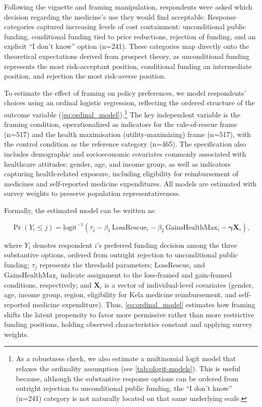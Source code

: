 \documentclass[11pt]{article}\usepackage[]{graphicx}\usepackage[]{xcolor}
\begin{document}
\begin{table}[htbp]
\end{table}

Following the vignette and framing manipulation, respondents were asked which decision regarding the medicine's use they would find acceptable. Response categories captured increasing levels of cost containment: unconditional public funding, conditional funding tied to price reductions, rejection of funding, and an explicit ``I don't know'' option (n=241). These categories map directly onto the theoretical expectations derived from prospect theory, as unconditional funding represents the most risk-acceptant position, conditional funding an intermediate position, and rejection the most risk-averse position.

To estimate the effect of framing on policy preferences, we model respondents' choices using an ordinal logistic regression, reflecting the ordered structure of the outcome variable (\autoref{eq:ordinal_model}).\footnote{As a robustness check, we also estimate a multinomial logit model that relaxes the ordinality assumption (see \autoref{tab:ologit-models}). This is useful because, although the substantive response options can be ordered from outright rejection to unconditional public funding, the ``I don't know'' (n=241) category is not naturally located on that same underlying scale.} The key independent variable is the framing condition, operationalized as indicators for the rule-of-rescue frame (n=517) and the health maximisation (utility-maximizing) frame (n=517), with the control condition as the reference category (n=465). The specification also includes demographic and socioeconomic covariates commonly associated with healthcare attitudes: gender, age, and income group, as well as indicators capturing health-related exposure, including eligibility for reimbursement of medicines and self-reported medicine expenditures. All models are estimated with survey weights to preserve population representativeness.


Formally, the estimated model can be written as:

\begin{equation}
\Pr(Y_i \leq j) =
\text{logit}^{-1}\!\left(\tau_j
- \beta_1 \,\text{LossRescue}_i
- \beta_2 \,\text{GainsHealthMax}_i
- \boldsymbol{\gamma}\mathbf{X}_i\right),
\label{eq:ordinal_model}
\end{equation}

where $Y_i$ denotes respondent $i$’s preferred funding decision among the three substantive options, ordered from outright rejection to unconditional public funding; $\tau_j$ represents the threshold parameters; $\text{LossRescue}_i$ and $\text{GainsHealthMax}_i$ indicate assignment to the loss-framed and gain-framed conditions, respectively; and $\mathbf{X}_i$ is a vector of individual-level covariates (gender, age, income group, region, eligibility for Kela medicine reimbursement, and self-reported medicine expenditure). Thus, \autoref{eq:ordinal_model} estimates how framing shifts the latent propensity to favor more permissive rather than more restrictive funding positions, holding observed characteristics constant and applying survey weights.
\end{document}
